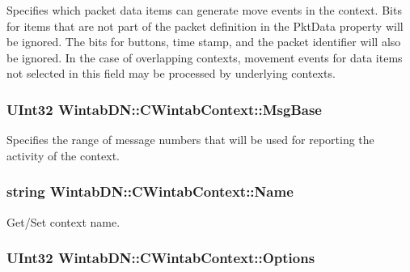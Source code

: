 Specifies which packet data items can generate move events in the context. Bits for items that are not part of the packet definition in the PktData property will be ignored. The bits for buttons, time stamp, and the packet identifier will also be ignored. In the case of overlapping contexts, movement events for data items not selected in this field may be processed by underlying contexts. 

\hypertarget{class_wintab_d_n_1_1_c_wintab_context_a9e0f2a0125c0f72f8d42f255eed799d9}{
\subsubsection[{MsgBase}]{\setlength{\rightskip}{0pt plus 5cm}UInt32 WintabDN::CWintabContext::MsgBase}}
\label{class_wintab_d_n_1_1_c_wintab_context_a9e0f2a0125c0f72f8d42f255eed799d9}


Specifies the range of message numbers that will be used for reporting the activity of the context. 

\hypertarget{class_wintab_d_n_1_1_c_wintab_context_a7a6350862c15ab27db4d465d3d70d71a}{
\subsubsection[{Name}]{\setlength{\rightskip}{0pt plus 5cm}string WintabDN::CWintabContext::Name}}
\label{class_wintab_d_n_1_1_c_wintab_context_a7a6350862c15ab27db4d465d3d70d71a}


Get/Set context name. 

\hypertarget{class_wintab_d_n_1_1_c_wintab_context_abe5e141b4c07ad5a52ed4fb47479af7a}{
\subsubsection[{Options}]{\setlength{\rightskip}{0pt plus 5cm}UInt32 WintabDN::CWintabContext::Options}}
\label{class_wintab_d_n_1_1_c_wintab_context_abe5e141b4c07ad5a52ed4fb47479af7a}


